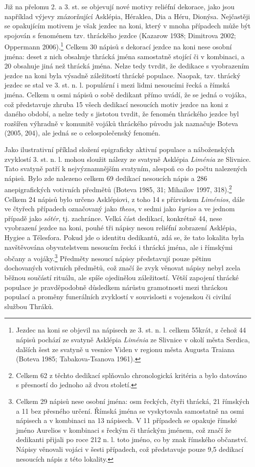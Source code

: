 Již na přelomu 2. a 3. st. se objevují nové motivy reliéfní dekorace, jako jsou například výjevy znázorňující Asklépia, Héraklea, Dia a Héru, Dionýsa. Nejčastěji se opakujícím motivem je však jezdec na koni, který v mnoha případech může být spojován s fenoménem tzv. thráckého jezdce (Kazarow 1938; Dimitrova 2002; Oppermann 2006).\footnote{Jezdec na koni se objevil na nápisech ze 3. st. n. l. celkem 55krát, z čehož 44 nápisů pochází ze svatyně Asklépia {\em Liménia} ze Slivnice v okolí města Serdica, dalších šest ze svatyně u vesnice Viden v regionu města Augusta Traiana (Boteva 1985; Tabakova-Tsanova 1961).} Celkem 30 nápisů s dekorací jezdce na koni nese osobní jména: deset z nich obsahuje thrácká jména samostatně stojící či v kombinaci, a 20 obsahuje jiná než thrácká jména. Nelze tedy tvrdit, že dedikace s vyobrazením jezdce na koni byla výsadně záležitostí thrácké populace. Naopak, tzv. thrácký jezdec se stal ve 3. st. n. l. populární i mezi lidmi nesoucími řecká a římská jména. Celkem u osmi nápisů o sobě dedikant přímo uvádí, že se jedná o vojáka, což představuje zhruba 15  všech dedikací nesoucích motiv jezdce na koni z daného období, a nelze tedy s jistotou tvrdit, že fenomén thráckého jezdce byl rozšířen výhradně v komunitě vojáků thráckého původu jak naznačuje Boteva (2005, 204), ale jedná se o celospolečenský fenomén.

Jako ilustrativní příklad složení epigraficky aktivní populace a náboženských zvyklostí 3. st. n. l. mohou sloužit nálezy ze svatyně Asklépia {\em Liménia} ze Slivnice. Tato svatyně patří k nejvýznamnějším svatyním, alespoň co do počtu nalezených nápisů. Bylo zde nalezeno celkem 69 dedikací nesoucích nápis a 286 anepigrafických votivních předmětů (Boteva 1985, 31; Mihailov 1997, 318).\footnote{Celkem 62 z těchto dedikací splňovalo chronologická kritéria a bylo datováno s přesností do jednoho až dvou století.} Celkem 24 nápisů bylo určeno Asklépiovi, z toho 14 s přízviskem {\em Liménios}, dále ve čtyřech případech označovaný jako {\em theos}, v sedmi jako {\em kyrios} a ve jednom případě jako {\em sótér}, tj. zachránce. Velká část dedikací, konkrétně 44, nese vyobrazení jezdce na koni, pouhé tři nápisy nesou reliéfní zobrazení Asklépia, Hygiee a Télesfora. Pokud jde o identitu dedikantů, zdá se, že tato lokalita byla navštěvována obyvatelstvem nesoucím řecká i thrácká jména, ale i římskými občany a vojáky.\footnote{Celkem 29 nápisů nese osobní jména: osm řeckých, čtyři thrácká, 21 římských a 11 bez přesného určení. Římská jména se vyskytovala samostatně na osmi nápisech a v kombinaci na 13 nápisech. V 11 případech se opakuje římské jméno Aurelios v kombinaci s řeckým či thráckým jménem, což značí že dedikanti přijali po roce 212 n. l. toto jméno, co by znak římského občanství. Nápisy věnovali vojáci v šesti případech, což představuje pouze 9,5  dedikací nesoucích nápis z této lokality.} Předměty nesoucí nápisy představují pouze pětinu dochovaných votivních předmětů, což značí že zvyk věnovat nápisy nebyl zcela běžnou součástí rituálu, ale spíše ojedinělou záležitostí. Větší zapojení thrácké populace je pravděpodobně důsledkem nárůstu gramotnosti mezi thráckou populací a proměny funerálních zvyklostí v souvislosti s vojenskou či civilní službou Thráků.

